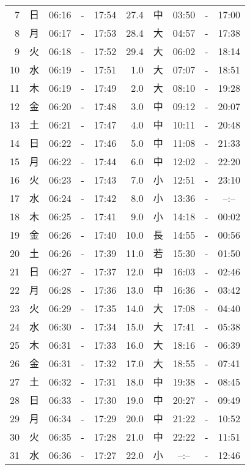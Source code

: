 \documentclass[a4j,10pt]{jsarticle}
\begin{document}
\begin{center}
\begin{table}[ht]
\begin{center}
\begin{tabular}{|rc|ccc|rc|ccc|}
  7 & 日 & 06:16 &-& 17:54 & 27.4 & 中 & 03:50 &-& 17:00 \\
  8 & 月 & 06:17 &-& 17:53 & 28.4 & 大 & 04:57 &-& 17:38 \\
  9 & 火 & 06:18 &-& 17:52 & 29.4 & 大 & 06:02 &-& 18:14 \\
 10 & 水 & 06:19 &-& 17:51 &  1.0 & 大 & 07:07 &-& 18:51 \\
 11 & 木 & 06:19 &-& 17:49 &  2.0 & 大 & 08:10 &-& 19:28 \\
 12 & 金 & 06:20 &-& 17:48 &  3.0 & 中 & 09:12 &-& 20:07 \\
 13 & 土 & 06:21 &-& 17:47 &  4.0 & 中 & 10:11 &-& 20:48 \\
 14 & 日 & 06:22 &-& 17:46 &  5.0 & 中 & 11:08 &-& 21:33 \\
 15 & 月 & 06:22 &-& 17:44 &  6.0 & 中 & 12:02 &-& 22:20 \\
 16 & 火 & 06:23 &-& 17:43 &  7.0 & 小 & 12:51 &-& 23:10 \\
 17 & 水 & 06:24 &-& 17:42 &  8.0 & 小 & 13:36 &-&  --:--  \\
 18 & 木 & 06:25 &-& 17:41 &  9.0 & 小 & 14:18 &-& 00:02 \\
 19 & 金 & 06:26 &-& 17:40 & 10.0 & 長 & 14:55 &-& 00:56 \\
 20 & 土 & 06:26 &-& 17:39 & 11.0 & 若 & 15:30 &-& 01:50 \\
 21 & 日 & 06:27 &-& 17:37 & 12.0 & 中 & 16:03 &-& 02:46 \\
 22 & 月 & 06:28 &-& 17:36 & 13.0 & 中 & 16:36 &-& 03:42 \\
 23 & 火 & 06:29 &-& 17:35 & 14.0 & 大 & 17:08 &-& 04:40 \\
 24 & 水 & 06:30 &-& 17:34 & 15.0 & 大 & 17:41 &-& 05:38 \\
 25 & 木 & 06:31 &-& 17:33 & 16.0 & 大 & 18:16 &-& 06:39 \\
 26 & 金 & 06:31 &-& 17:32 & 17.0 & 大 & 18:55 &-& 07:41 \\
 27 & 土 & 06:32 &-& 17:31 & 18.0 & 中 & 19:38 &-& 08:45 \\
 28 & 日 & 06:33 &-& 17:30 & 19.0 & 中 & 20:27 &-& 09:49 \\
 29 & 月 & 06:34 &-& 17:29 & 20.0 & 中 & 21:22 &-& 10:52 \\
 30 & 火 & 06:35 &-& 17:28 & 21.0 & 中 & 22:22 &-& 11:51 \\
 31 & 水 & 06:36 &-& 17:27 & 22.0 & 小 &  --:--  &-& 12:46 \\
    \hline
    \end{tabular}
    \end{center}

\end{table}
\end{center}
\end{document}
